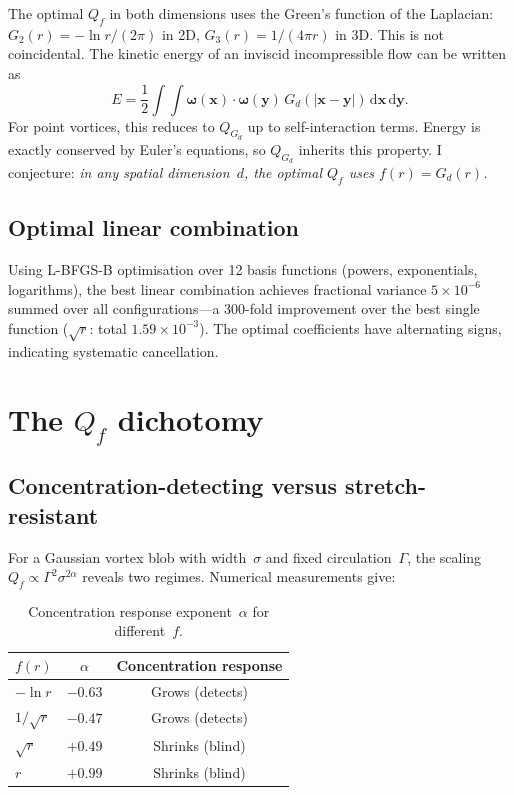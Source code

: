 \documentclass[rapids]{jfm}
\begin{document}
The optimal $Q_f$ in both dimensions uses the Green's function of the Laplacian: $G_2(r) = -\ln r / (2\pi)$ in 2D, $G_3(r) = 1/(4\pi r)$ in 3D. This is not coincidental. The kinetic energy of an inviscid incompressible flow can be written as \citep{saffman1992, majda2002}
\begin{equation}
E = \frac{1}{2} \int\!\!\int \boldsymbol{\omega}(\boldsymbol{x}) \cdot \boldsymbol{\omega}(\boldsymbol{y}) \, G_d(|\boldsymbol{x} - \boldsymbol{y}|) \,\mathrm{d}\boldsymbol{x}\,\mathrm{d}\boldsymbol{y}.
\label{eq:energy}
\end{equation}
For point vortices, this reduces to $Q_{G_d}$ up to self-interaction terms. Energy is exactly conserved by Euler's equations, so $Q_{G_d}$ inherits this property. I conjecture: \textit{in any spatial dimension~$d$, the optimal $Q_f$ uses $f(r) = G_d(r)$.}

\subsection{Optimal linear combination}

Using L-BFGS-B optimisation over 12 basis functions (powers, exponentials, logarithms), the best linear combination achieves fractional variance $5 \times 10^{-6}$ summed over all configurations---a $300$-fold improvement over the best single function ($\sqrt{r}$: total $1.59 \times 10^{-3}$). The optimal coefficients have alternating signs, indicating systematic cancellation.

\section{The $Q_f$ dichotomy}

\subsection{Concentration-detecting versus stretch-resistant}

For a Gaussian vortex blob with width~$\sigma$ and fixed circulation~$\Gamma$, the scaling $Q_f \propto \Gamma^2 \sigma^{2\alpha}$ reveals two regimes. Numerical measurements give:

\begin{table}
\centering
\caption{Concentration response exponent~$\alpha$ for different~$f$.}
\label{tab:dichotomy}
\begin{tabular}{@{}lcc@{}}
\toprule
$f(r)$ & $\alpha$ & Concentration response \\
\midrule
$-\ln r$    & $-0.63$ & Grows (detects) \\
$1/\sqrt{r}$ & $-0.47$ & Grows (detects) \\
$\sqrt{r}$  & $+0.49$ & Shrinks (blind) \\
$r$         & $+0.99$ & Shrinks (blind) \\
\bottomrule
\end{tabular}
\end{table}
\end{document}
